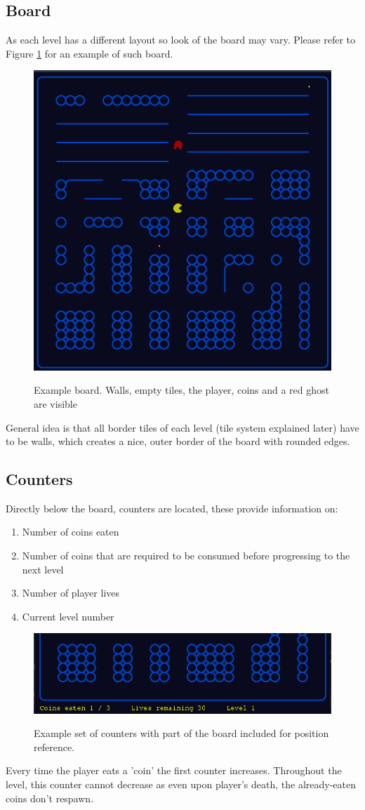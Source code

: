 \documentclass[11pt,a4paper]{report}
\newcommand{\dsubsection}[1]{\FloatBarrier \subsection{#1}}
\newenvironment{img}{
	\begin{center}
		\begin{figure}[H]
			\begin{center}
			
}{
	\end{center}
		\end{figure}
			\end{center}
}
\begin{document}
			\dsubsection{Board}
				As each level has a different layout so look of the board may vary. Please refer to Figure \ref{example_board} for an example of such board.
				\begin{img}
					\includegraphics[width=350pt]{images/board_example}\\
					\caption{Example board. Walls, empty tiles, the player, coins and a red ghost are visible}
					\label{example_board}
				\end{img}
				General idea is that all border tiles of each level (tile system explained later) have to be walls, which creates a nice, outer border of the board with rounded edges.
			\dsubsection{Counters}
				Directly below the board, counters are located, these provide information on:
				\begin{enumerate}
					\item
						Number of coins eaten
					\item
						Number of coins that are required to be consumed before progressing to the next level
					\item
						Number of player lives
					\item
						Current level number
				\end{enumerate}
				\begin{img}
					\includegraphics[width=350pt]{images/counter_example}\\
					\caption{Example set of counters with part of the board included for position reference.}
				\end{img}
				Every time the player eats a 'coin' the first counter increases. Throughout the level, this counter cannot decrease as even upon player's death, the already-eaten coins don't respawn.
				
\end{document}

